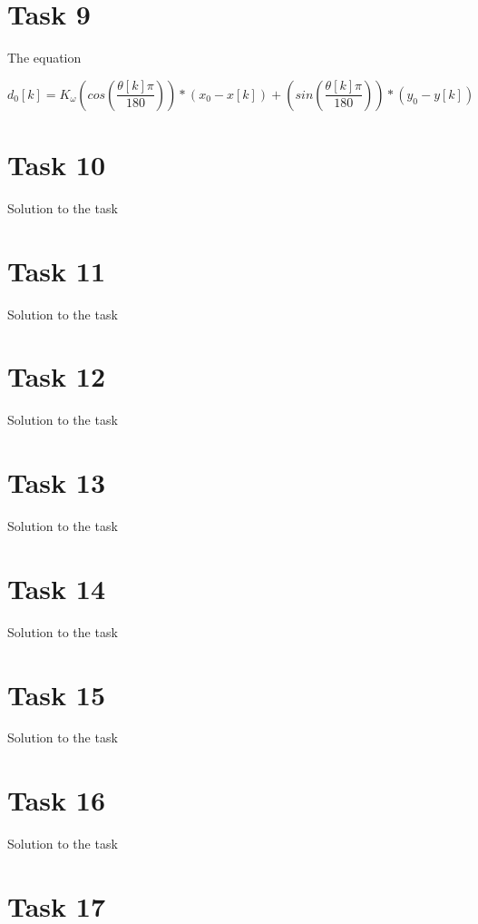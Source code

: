 \documentclass[a4paper,12pt,oneside,onecolumn]{article} %
\begin{document}
\section*{Task 9}

 	The equation 

	\begin{equation}
		d_0[k] = K_\omega(cos(\frac{\theta[k]\pi}{180}))*(x_0-x[k]) + (sin(\frac{\theta[k]\pi}{180}))*(y_0-y[k])
	\end{equation}

\section*{Task 10}

Solution to the task

\section*{Task 11}

Solution to the task

\section*{Task 12}

Solution to the task

\section*{Task 13}

Solution to the task

\section*{Task 14}

Solution to the task

\section*{Task 15}

Solution to the task

\section*{Task 16}

Solution to the task

\section*{Task 17}
\end{document}
